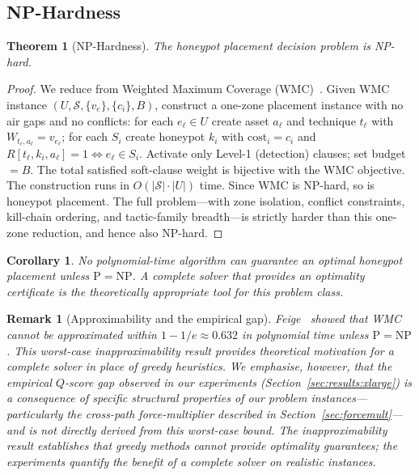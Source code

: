 \documentclass[journal]{IEEEtran}
\newtheorem{theorem}{Theorem}
\newtheorem{corollary}{Corollary}
\newtheorem{remark}{Remark}
\newcommand{\qscore}{$Q$-score}
\begin{document}
\subsection{NP-Hardness}
\label{sec:np}

\begin{theorem}[NP-Hardness]
\label{thm:nph}
The honeypot placement decision problem is NP-hard.
\end{theorem}

\begin{proof}
We reduce from Weighted Maximum Coverage (WMC)~\cite{feige1998}.
Given WMC instance $(U,\mathcal{S},\{v_e\},\{c_i\},B)$, construct a
one-zone placement instance with no air gaps and no conflicts: for
each $e_\ell\in U$ create asset $a_\ell$ and technique $t_\ell$ with
$W_{t_\ell,a_\ell}=v_{e_\ell}$; for each $S_i$ create honeypot $k_i$
with $\mathrm{cost}_i=c_i$ and $R[t_\ell,k_i,a_\ell]=1\iff e_\ell
\in S_i$. Activate only Level-1 (detection) clauses; set budget
$=B$. The total satisfied soft-clause weight is bijective with the
WMC objective. The construction runs in $O(|\mathcal{S}|\cdot|U|)$
time. Since WMC is NP-hard, so is honeypot placement. The full
problem---with zone isolation, conflict constraints, kill-chain
ordering, and tactic-family breadth---is strictly harder than this
one-zone reduction, and hence also NP-hard.
\end{proof}

\begin{corollary}
\label{cor:nopoly}
No polynomial-time algorithm can guarantee an optimal honeypot
placement unless $\mathrm{P}=\mathrm{NP}$. A complete solver that
provides an optimality certificate is the theoretically appropriate
tool for this problem class.
\end{corollary}

\begin{remark}[Approximability and the empirical gap]
\label{rem:approx}
Feige~\cite{feige1998} showed that WMC cannot be approximated
within $1-1/e\approx0.632$ in polynomial time unless
$\mathrm{P}=\mathrm{NP}$. This worst-case inapproximability result
provides theoretical motivation for a complete solver in place of
greedy heuristics. We emphasise, however, that the empirical
\qscore{} gap observed in our experiments
(Section~\ref{sec:results:xlarge}) is a consequence of specific
structural properties of our problem instances---particularly the
cross-path force-multiplier described in
Section~\ref{sec:forcemult}---and is not directly derived from this
worst-case bound. The inapproximability result establishes that
greedy methods cannot provide optimality guarantees; the experiments
quantify the benefit of a complete solver on realistic instances.
\end{remark}
\end{document}
